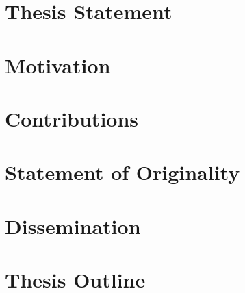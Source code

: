 \section{Thesis Statement}

\section{Motivation}

\section{Contributions}

\section{Statement of Originality}

\section{Dissemination}

\section{Thesis Outline}